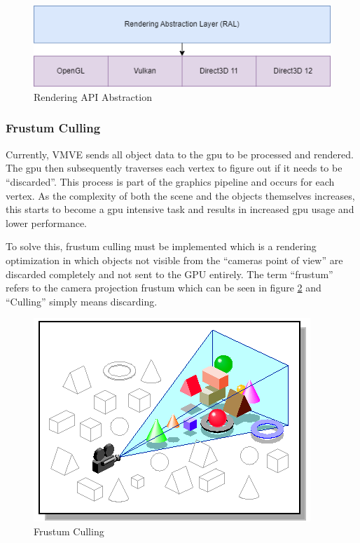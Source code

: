 \documentclass[11pt]{article}
\begin{document}
\begin{figure}[h!]
  \centering
  \includegraphics[width=\textwidth]{images/api_abstraction.png}
  \caption{Rendering API Abstraction}
  \label{fig:api_abstraction}
\end{figure}

\subsubsection{Frustum Culling}
Currently, VMVE sends all object data to the \gls{gpu} to be processed and
rendered. The \gls{gpu} then subsequently traverses each vertex to figure out if
it needs to be ``discarded''. This process is part of the graphics pipeline and
occurs for each vertex. As the complexity of both the scene and the objects
themselves increases, this starts to become a \gls{gpu} intensive task and
results in increased \gls{gpu} usage and lower performance.

To solve this, frustum culling must be implemented which is a rendering
optimization in which objects not visible from the ``cameras point of view'' are
discarded completely and not sent to the GPU entirely. The term ``frustum'' refers
to the camera projection frustum which can be seen in figure
\ref{fig:frustum_culling} and ``Culling'' simply means discarding.

\begin{figure}[h!]
  \centering
  \includegraphics[width=\textwidth]{images/frustum_culling.png}
  \caption{Frustum Culling \cite{frustum_culling}}
  \label{fig:frustum_culling}
\end{figure}
\end{document}
